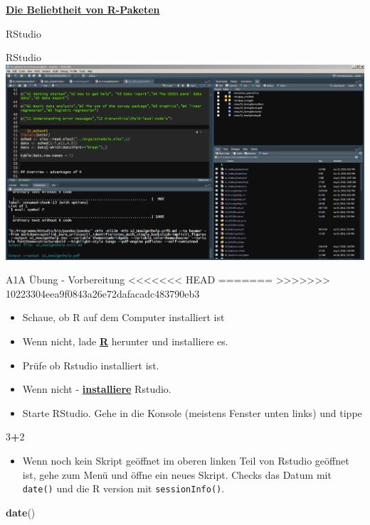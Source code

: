 \documentclass[ignorenonframetext,]{beamer}
\newenvironment{Shaded}{\begin{snugshade}}{\end{snugshade}}
\newcommand{\KeywordTok}[1]{\textcolor[rgb]{0.13,0.29,0.53}{\textbf{#1}}}
\newcommand{\DecValTok}[1]{\textcolor[rgb]{0.00,0.00,0.81}{#1}}
\newcommand{\OperatorTok}[1]{\textcolor[rgb]{0.81,0.36,0.00}{\textbf{#1}}}
\newcommand{\NormalTok}[1]{#1}
\newcommand{\DecValTok}[1]{\textcolor[rgb]{0.00,0.00,0.81}{#1}}
\newcommand{\KeywordTok}[1]{\textcolor[rgb]{0.13,0.29,0.53}{\textbf{#1}}}
\newcommand{\NormalTok}[1]{#1}
\newcommand{\OperatorTok}[1]{\textcolor[rgb]{0.81,0.36,0.00}{\textbf{#1}}}
\providecommand{\tightlist}{%
  \setlength{\itemsep}{0pt}\setlength{\parskip}{0pt}}
\begin{document}
\begin{frame}{\href{https://gallery.shinyapps.io/cran-gauge/}{\textbf{Die
Beliebtheit von R-Paketen}}}
\begin{frame}{RStudio}
\begin{frame}{RStudio}
\includegraphics{figure/RstudioExample.PNG}

\end{frame}

\begin{frame}[fragile]{A1A Übung - Vorbereitung}
<<<<<<< HEAD
=======
\protect\hypertarget{a1a-ubung---vorbereitung}{}
>>>>>>> 10223304eea9f0843a26e72dafacadc483790eb3

\begin{itemize}
\tightlist
\item
  Schaue, ob R auf dem Computer installiert ist
\item
  Wenn nicht, lade \href{r-project.org}{\textbf{R}} herunter und
  installiere es.
\item
  Prüfe ob Rstudio installiert ist.
\item
  Wenn nicht - \href{http://www.rstudio.com/}{\textbf{installiere}}
  Rstudio.
\item
  Starte RStudio. Gehe in die Konsole (meistens Fenster unten links) und
  tippe
\end{itemize}

\begin{Shaded}
\begin{Highlighting}[]
\DecValTok{3}\OperatorTok{+}\DecValTok{2}
\end{Highlighting}
\end{Shaded}

\begin{itemize}
\tightlist
\item
  Wenn noch kein Skript geöffnet im oberen linken Teil von Rstudio
  geöffnet ist, gehe zum Menü und öffne ein neues Skript. Checks das
  Datum mit \texttt{date()} und die R version mit
  \texttt{sessionInfo()}.
\end{itemize}

\begin{Shaded}
\begin{Highlighting}[]
\KeywordTok{date}\NormalTok{()}
\end{Highlighting}
\end{Shaded}


\end{frame}
\end{frame}
\end{frame}
\end{document}
